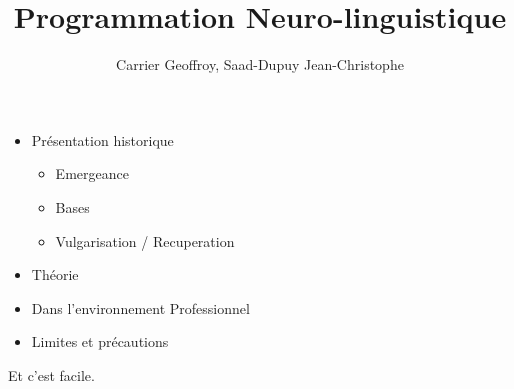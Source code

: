 \documentclass{beamer}
\title{Programmation Neuro-linguistique}
\author{Carrier Geoffroy, Saad-Dupuy Jean-Christophe}\institute{L3 MIAGE}
\begin{document}
  \begin{frame}
  \titlepage
  \end{frame}

  \begin{frame}
	\begin{itemize}
	\item Présentation historique
		\begin{itemize}
			\item Emergeance
			\item Bases
			\item Vulgarisation / Recuperation
		\end{itemize}
	\item Théorie
	\item Dans l'environnement Professionnel
	\item Limites et précautions
	\end{itemize}
  \end{frame}

  \begin{frame}
  	Et c'est facile.
  \end{frame}

  
\end{document}

